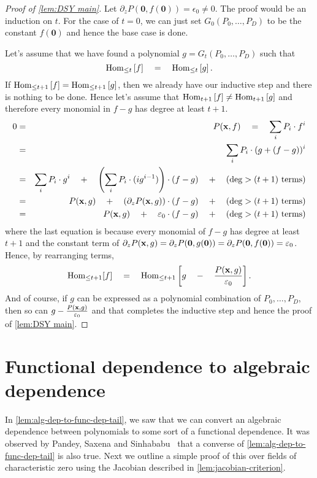 \begin{proof}[Proof of \autoref{lem:DSY main}]
Let $\partial_zP(\mathbf{0}, f(\mathbf{0})) = \epsilon_0 \neq 0$. 
The proof would be an induction on $t$. For the case of $t = 0$, we can just set $G_0(P_0,\ldots, P_D)$ to be the constant $f(\mathbf{0})$ and hence the base case is done. 

\noindent
Let's assume that we have found a polynomial $g = G_t(P_0, \ldots, P_D)$ such that 
\[
\operatorname{Hom}_{\leq t}\left[f\right] \quad = \quad \operatorname{Hom}_{\leq t} \left[g\right]. 
\]
If $\operatorname{Hom}_{\leq t+1}\left[f\right]= \operatorname{Hom}_{\leq t+1} \left[g\right]$, then we already have our inductive step and there is nothing to be done.  Hence let's assume that $\operatorname{Hom}_{t+1}\left[f\right] \neq \operatorname{Hom}_{t+1}\left[g\right]$ and therefore every monomial in $f-g$ has degree at least $t+1$. 
\begin{eqnarray*}
0  & = &  P(\mathbf{x}, f) \quad = \quad \sum_i P_i \cdot f^i\\
   & = & \sum_i P_i \cdot (g + (f-g))^i\\
   & = & \sum_i P_i \cdot g^i \quad + \quad \left(\sum_i P_i \cdot (i g^{i-1})\right) \cdot (f-g) \quad + \quad (\text{$\deg > (t+1)$ terms})\\
   & = & P(\mathbf{x}, g) \quad + \quad \left(\partial_z P(\mathbf{x}, g)\right) \cdot (f-g) \quad + \quad (\text{$\deg > (t+1)$ terms})\\
   & = & P(\mathbf{x}, g) \quad + \quad \varepsilon_0 \cdot (f-g) \quad + \quad (\text{$\deg > (t+1)$ terms})
\end{eqnarray*}
where the last equation is because every monomial of $f-g$ has degree at least $t+1$ and the constant term of $\partial_zP(\mathbf{x}, g) = \partial_zP(\mathbf{0}, g(\mathbf{0})) =  \partial_zP(\mathbf{0}, f(\mathbf{0})) = \varepsilon_0$. Hence, by rearranging terms, 
\[
\operatorname{Hom}_{\leq t+1}[f] \quad = \quad \operatorname{Hom}_{\leq t+1}\left[g \quad - \quad \frac{P(\mathbf{x}, g)}{\varepsilon_0}\right].
\]
And of course, if $g$ can be expressed as a polynomial combination of $P_0,\ldots, P_D$, then so can $g - \frac{P(\mathbf{x}, g)}{\varepsilon_0}$ and that completes the inductive step and hence the proof of \autoref{lem:DSY main}. 
\end{proof}

\section{Functional dependence to algebraic dependence}

In \autoref{lem:alg-dep-to-func-dep-tail}, we saw that we can convert an algebraic dependence between polynomials to some sort of a functional dependence. It was observed by Pandey, Saxena and Sinhababu~\cite{PSS16} that a converse of \autoref{lem:alg-dep-to-func-dep-tail} is also true. Next we outline a simple proof of this over fields of characteristic zero using the Jacobian described in \autoref{lem:jacobian-criterion}. 


